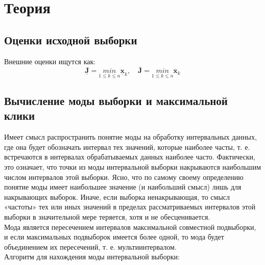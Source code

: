 \section{Теория}

\subsection{Оценки исходной выборки} 

Внешние оценки ищутся как: \\

\begin{equation}
	\underline{\bm{J}} = \underset{1 \leq k \leq n }{min} \underline{\bm{x}}_{k}, \quad \overline{\bm{J}} = \underset{1 \leq k \leq n }{min} \overline{\bm{x}}_{k}
\end{equation}


\subsection{Вычисление моды выборки и максимальной клики}

Имеет смысл распространить понятие моды на обработку интервальных данных, где она будет обозначать интервал тех значений, которые наиболее часты, т. е. встречаются в интервалах обрабатываемых данных наиболее часто. Фактически, это означает, что точки из моды интервальной выборки накрываются наибольшим числом интервалов этой выборки. Ясно, что по самому своему определению понятие моды имеет наибольшее значение (и наибольший смысл) лишь для накрывающих выборок. Иначе, если выборка ненакрывающая, то смысл «частоты» тех или иных значений в пределах рассматриваемых интервалов этой выборки в значительной мере теряется, хотя и не обесценивается. \\
Мода является пересечением интервалов максимальной совместной подвыборки, и если максимальных подвыборок имеется более одной, то мода будет объединением их пересечений, т. е. мультиинтервалом.\\

Алгоритм для нахождения моды интервальной выборки: \\

